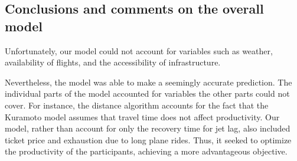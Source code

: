\subsection{Conclusions and comments on the overall model}
Unfortunately, our model could not account for variables such as weather, availability of flights, and the accessibility of infrastructure.  


Nevertheless, the model was able to make a seemingly accurate prediction. The individual parts of the model accounted for variables the other parts could not cover. For instance, the distance algorithm accounts for the fact that the Kuramoto model assumes that travel time does not affect productivity. Our model, rather than account for only the recovery time for jet lag, also included ticket price and exhaustion due to long plane rides. Thus, it seeked to optimize the productivity of the participants, achieving a more advantageous objective.



